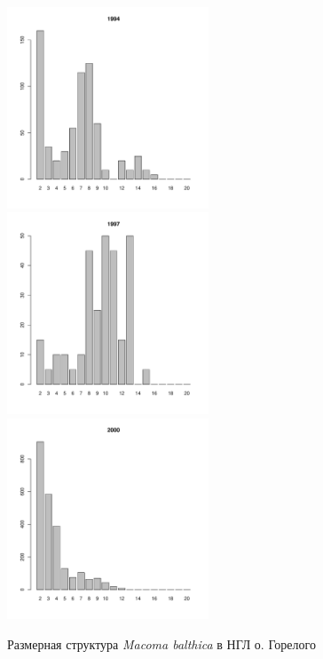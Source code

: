 \documentclass[12pt, a4paper]{article}
\begin{document}
\begin{figure}[h]
\begin{multicols}{3}
\hfill
\includegraphics[width=60mm]{../White_Sea/Luvenga_Goreliy/low2_1994_.pdf}
\hfill
\includegraphics[width=60mm]{../White_Sea/Luvenga_Goreliy/low2_1997_.pdf}
\hfill
\includegraphics[width=60mm]{../White_Sea/Luvenga_Goreliy/low2_2000_.pdf}
\end{multicols}



\caption{Размерная структура {\it Macoma balthica} в НГЛ о. Горелого}
\label{ris:size_str_Goreliy_low}
\end{figure}
\end{document}
